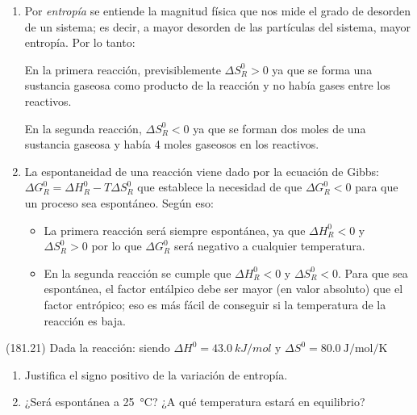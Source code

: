   \begin{solution}
    \begin{enumerate}
      \item Por \textit{entropía} se entiende la magnitud física que nos mide el grado de desorden de un sistema; es decir, a mayor desorden de las partículas del sistema, mayor entropía. Por lo tanto:

      En la primera reacción, previsiblemente \( \Delta S^0_R > 0 \) ya que se forma una sustancia gaseosa como producto de la reacción y no había gases entre los reactivos.

      En la segunda reacción, \( \Delta S^0_R < 0 \) ya que se forman dos moles de una sustancia gaseosa y había 4 moles gaseosos en los reactivos.

      \item La espontaneidad de una reacción viene dado por la ecuación de Gibbs: \( \Delta G^0_R = \Delta H^0_R - T\Delta S^0_R \) que establece la necesidad de que \( \Delta G^0_R < 0 \) para que un proceso sea espontáneo. Según eso:

      \begin{itemize}
        \item La primera reacción será siempre espontánea, ya que \( \Delta H^0_R < 0 \) y \( \Delta S^0_R > 0 \) por lo que \( \Delta G^0_R \) será negativo a cualquier temperatura.
        \item En la segunda reacción se cumple que \( \Delta H^0_R < 0 \) y \( \Delta S^0_R < 0 \). Para que sea espontánea, el factor entálpico debe ser mayor (en valor absoluto) que el factor entrópico; eso es más fácil de conseguir si la temperatura de la reacción es baja.
      \end{itemize}
    \end{enumerate}
  \end{solution}




  \begin{exercise}[
      tags    = {},
      topics  = {química, termodinámica, termoquímica},
      source  = {FQ 1B MGH 2016, p181, e21},
    ]
    (181.21) Dada la reacción: 
    siendo \( \Delta H^0 = \SI{43.0}{kJ/mol} \) y \( \Delta S^0 = \SI{80.0}{\joule\per\mole\per\kelvin} \)
    \begin{enumerate}
      \item Justifica el signo positivo de la variación de entropía.
      \item ¿Será espontánea a \SI{25}{\celsius}? ¿A qué temperatura estará en
      equilibrio?
    \end{enumerate}
  \end{exercise}

